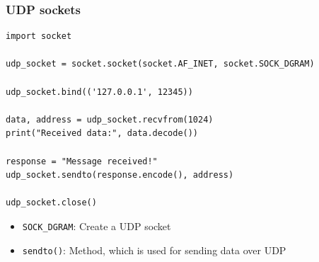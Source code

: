 \subsubsection{UDP sockets}
\begin{codebox}
\begin{verbatim}
import socket

udp_socket = socket.socket(socket.AF_INET, socket.SOCK_DGRAM)

udp_socket.bind(('127.0.0.1', 12345))

data, address = udp_socket.recvfrom(1024)
print("Received data:", data.decode())

response = "Message received!"
udp_socket.sendto(response.encode(), address)

udp_socket.close()
\end{verbatim}
\end{codebox}
\begin{itemize}
\item \texttt{SOCK\_DGRAM}: Create a UDP socket
\item \texttt{sendto()}: Method, which is used for sending data over UDP
\end{itemize}

\newpage
